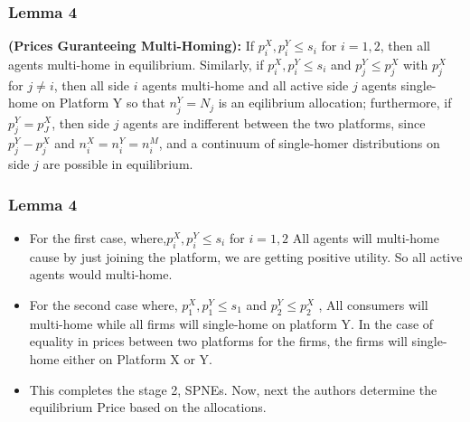 \documentclass[11pt]{beamer}
\theoremstyle{boldstyle}
\begin{document}
\begin{frame}
	\frametitle{Lemma 4}
	\begin{small}
		\begin{lemma}
			\textbf{(Prices Guranteeing Multi-Homing):} If $p_i^X,p_i^Y \leq s_i$ for $i=1,2$, then all agents multi-home in equilibrium. Similarly, if $p_i^X,p_i^Y \leq s_i$ and $p_j^Y \leq p_j^X$ with $p_j^X$ for $j \neq i$, then all side $i$ agents multi-home and all active side $j$ agents single-home on Platform Y so that $n_j^Y=N_j$ is an eqilibrium allocation; furthermore, if $p_j^Y=p_J^X$, then side $j$ agents are indifferent between the two platforms, since $p_j^Y-p_j^X$ and $n_i^X=n_i^Y=n_i^M$, and a continuum of single-homer distributions on side $j$ are possible in equilibrium. 

			
		\end{lemma}
	\end{small}
\end{frame}

\begin{frame}
	\frametitle{Lemma 4}
	\begin{small}
\begin{itemize}
	\item For the first case, where,$p_i^X,p_i^Y \leq s_i$ for $i=1,2$  All agents will multi-home cause by just joining the platform, we are getting positive utility. So all active agents would multi-home. 
	\item For the second case where, $p_1^X, p_1^Y \leq s_1$ and $p_2^Y \leq p_2^X$ , All consumers will multi-home while all firms will single-home on platform Y. In the case of equality in prices between two platforms for the firms, the firms will single-home either on Platform X or Y. 
	\item This completes the stage 2, SPNEs. Now, next the authors determine the equilibrium Price based on the allocations.  
\end{itemize}
	\end{small}
\end{frame}
\end{document}
